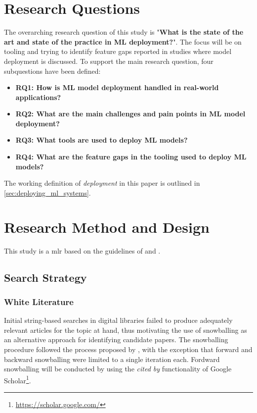 \section{Research Questions}
\label{sec:research_questions}
The overarching research question of this study is "\textbf{What is the state of the art and state of the practice in ML deployment?}".
The focus will be on tooling and trying to identify feature gaps reported in studies where model deployment is discussed.
To support the main research question, four subquestions have been defined:
\begin{itemize}
    \item \textbf{RQ1: How is ML model deployment handled in real-world applications?}
    \item \textbf{RQ2: What are the main challenges and pain points in ML model deployment?}
    \item \textbf{RQ3: What tools are used to deploy ML models?}
    \item \textbf{RQ4: What are the feature gaps in the tooling used to deploy ML models?}
\end{itemize}
The working definition of \emph{deployment} in this paper is outlined in \cref{sec:deploying_ml_systems}.

\section{Research Method and Design}
\label{sec:research_method}
This study is a \acrfull{mlr} based on the guidelines of \textcite{Kitchenham07guidelinesfor} and \textcite{Garousi2019}.

\subsection{Search Strategy}
\subsubsection{White Literature}
Initial string-based searches in digital libraries failed to produce adequately relevant articles for the topic at hand, thus motivating the use of snowballing as an alternative approach for identifying candidate papers.
The snowballing procedure followed the process proposed by \textcite{Wohlin2014}, with the exception that forward and backward snowballing were limited to a single iteration each.
Fordward snowballing will be conducted by using the \emph{cited by} functionality of Google Scholar\footnote{\url{https://scholar.google.com/}}.

